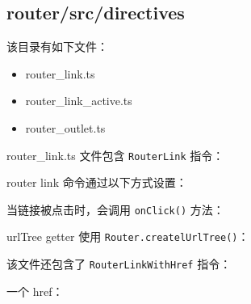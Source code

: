 \subsection{router/src/directives}


该目录有如下文件：

\begin{itemize}
  \item router\_link.ts
  \item router\_link\_active.ts
  \item router\_outlet.ts
\end{itemize}


router\_link.ts 文件包含 \texttt{RouterLink} 指令：




router link 命令通过以下方式设置：




当链接被点击时，会调用 \texttt{onClick()} 方法：




urlTree getter 使用 \texttt{Router.createlUrlTree()}：




该文件还包含了 \texttt{RouterLinkWithHref} 指令：




一个 href：



